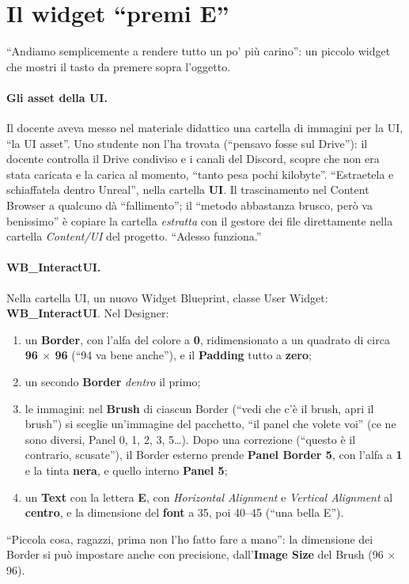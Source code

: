 \section{Il widget ``premi E''}
\label{ue12:sec:widget}

``Andiamo semplicemente a rendere tutto un po' più carino'': un piccolo widget che mostri il
tasto da premere sopra l'oggetto.

\paragraph{Gli asset della UI.} Il docente aveva messo nel materiale didattico una cartella
di immagini per la UI, ``la UI asset''. Uno studente non l'ha trovata (``pensavo
fosse sul Drive''): il docente controlla il Drive condiviso e i canali del Discord, scopre che
non era stata caricata e la carica al momento, ``tanto pesa pochi kilobyte''. ``Estraetela e
schiaffatela dentro Unreal'', nella cartella \textbf{UI}. Il trascinamento nel Content
Browser a qualcuno dà ``fallimento''; il ``metodo abbastanza brusco, però va benissimo'' è
copiare la cartella \emph{estratta} con il gestore dei file direttamente nella cartella
\emph{Content/UI} del progetto. ``Adesso funziona.''

\paragraph{WB\_InteractUI.} Nella cartella UI, un nuovo Widget Blueprint, classe User
Widget: \textbf{WB\_InteractUI}. Nel Designer:
\begin{enumerate}
  \item un \textbf{Border}, con l'alfa del colore a \textbf{0}, ridimensionato a un
        quadrato di circa \textbf{96 $\times$ 96} (``94 va bene anche''), e il
        \textbf{Padding} tutto a \textbf{zero};
  \item un secondo \textbf{Border} \emph{dentro} il primo;
  \item le immagini: nel \textbf{Brush} di ciascun Border (``vedi che c'è il brush, apri il
        brush'') si sceglie un'immagine del pacchetto, ``il panel che volete voi'' (ce ne
        sono diversi, Panel 0, 1, 2, 3, 5\dots). Dopo una correzione (``questo è il
        contrario, scusate''), il Border esterno prende \textbf{Panel Border 5}, con l'alfa a
        \textbf{1} e la tinta \textbf{nera}, e quello interno \textbf{Panel 5};
  \item un \textbf{Text} con la lettera \textbf{E}, con \emph{Horizontal Alignment} e
        \emph{Vertical Alignment} al \textbf{centro}, e la dimensione del \textbf{font} a
        35, poi 40--45 (``una bella E'').
\end{enumerate}
``Piccola cosa, ragazzi, prima non l'ho fatto fare a mano'': la dimensione dei Border si può
impostare anche con precisione, dall'\textbf{Image Size} del Brush (96 $\times$ 96).

